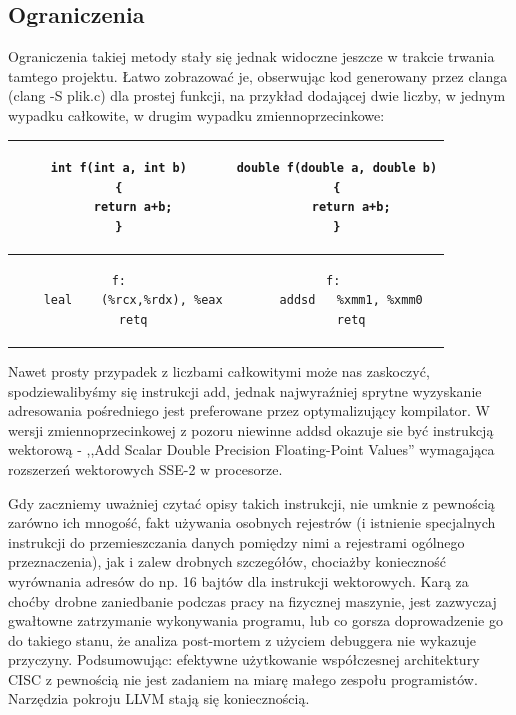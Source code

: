 \subsection{Ograniczenia}
Ograniczenia takiej metody stały się jednak widoczne jeszcze w trakcie trwania tamtego projektu. Łatwo zobrazować je, obserwując kod generowany przez clanga (clang -S plik.c) dla prostej funkcji, na przykład dodającej dwie liczby, w jednym wypadku całkowite, w drugim wypadku zmiennoprzecinkowe:
\begin{center}
\begin{tabular}{|c | c|}
\hline
\begin{lstlisting}
int f(int a, int b)
{
    return a+b;
}
\end{lstlisting}
&
\begin{lstlisting}
double f(double a, double b)
{
    return a+b;
}
\end{lstlisting}
\\ \hline
\begin{lstlisting}
f:
	leal	(%rcx,%rdx), %eax
	retq
\end{lstlisting}
&
\begin{lstlisting}
f: 
	addsd	%xmm1, %xmm0
	retq
\end{lstlisting}
\\ \hline
\end{tabular}
\end{center}
Nawet prosty przypadek z liczbami całkowitymi może nas zaskoczyć, spodziewalibyśmy się instrukcji add, jednak najwyraźniej sprytne wyzyskanie adresowania pośredniego jest preferowane przez optymalizujący kompilator. W wersji zmiennoprzecinkowej z pozoru niewinne addsd okazuje sie być instrukcją wektorową - ,,Add Scalar Double Precision Floating-Point Values''\cite{ADDSD_instr} wymagająca rozszerzeń wektorowych SSE-2 w procesorze. 

Gdy zaczniemy uważniej czytać opisy takich instrukcji, nie umknie z pewnością zarówno ich mnogość, fakt używania osobnych rejestrów (i istnienie specjalnych instrukcji do przemieszczania danych pomiędzy nimi a rejestrami ogólnego przeznaczenia), jak i zalew drobnych szczegółów, chociażby konieczność wyrównania adresów do np. 16 bajtów dla instrukcji wektorowych. Karą za choćby drobne zaniedbanie podczas pracy na fizycznej maszynie, jest zazwyczaj gwałtowne zatrzymanie wykonywania programu, lub co gorsza doprowadzenie go do takiego stanu, że analiza post-mortem z użyciem debuggera nie wykazuje przyczyny. Podsumowując: efektywne użytkowanie współczesnej architektury CISC z pewnością nie jest zadaniem na miarę małego zespołu programistów. Narzędzia pokroju LLVM stają się koniecznością.


